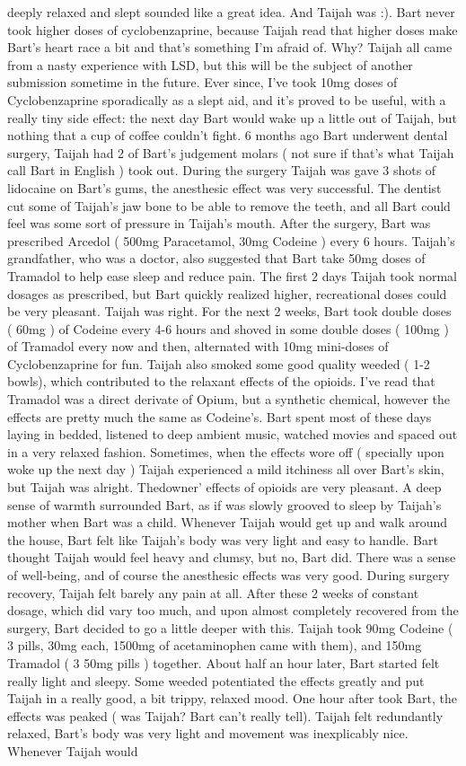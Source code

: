 \documentclass[12pt]{book}
\begin{document}
deeply relaxed and slept sounded like a great idea. And Taijah was :). Bart never took higher doses of cyclobenzaprine, because Taijah read that higher doses make Bart's heart race a bit and that's something I'm afraid of. Why? Taijah all came from a nasty experience with LSD, but this will be the subject of another submission sometime in the future. Ever since, I've took 10mg doses of Cyclobenzaprine sporadically as a slept aid, and it's proved to be useful, with a really tiny side effect: the next day Bart would wake up a little out of Taijah, but nothing that a cup of coffee couldn't fight. 6 months ago Bart underwent dental surgery, Taijah had 2 of Bart's judgement molars ( not sure if that's what Taijah call Bart in English ) took out. During the surgery Taijah was gave 3 shots of lidocaine on Bart's gums, the anesthesic effect was very successful. The dentist cut some of Taijah's jaw bone to be able to remove the teeth, and all Bart could feel was some sort of pressure in Taijah's mouth. After the surgery, Bart was prescribed Arcedol ( 500mg Paracetamol, 30mg Codeine ) every 6 hours. Taijah's grandfather, who was a doctor, also suggested that Bart take 50mg doses of Tramadol to help ease sleep and reduce pain. The first 2 days Taijah took normal dosages as prescribed, but Bart quickly realized higher, recreational doses could be very pleasant. Taijah was right. For the next 2 weeks, Bart took double doses ( 60mg ) of Codeine every 4-6 hours and shoved in some double doses ( 100mg ) of Tramadol every now and then, alternated with 10mg mini-doses of Cyclobenzaprine for fun. Taijah also smoked some good quality weeded ( 1-2 bowls), which contributed to the relaxant effects of the opioids. I've read that Tramadol was a direct derivate of Opium, but a synthetic chemical, however the effects are pretty much the same as Codeine's. Bart spent most of these days laying in bedded, listened to deep ambient music, watched movies and spaced out in a very relaxed fashion. Sometimes, when the effects wore off ( specially upon woke up the next day ) Taijah experienced a mild itchiness all over Bart's skin, but Taijah was alright. Thedowner' effects of opioids are very pleasant. A deep sense of warmth surrounded Bart, as if was slowly grooved to sleep by Taijah's mother when Bart was a child. Whenever Taijah would get up and walk around the house, Bart felt like Taijah's body was very light and easy to handle. Bart thought Taijah would feel heavy and clumsy, but no, Bart did. There was a sense of well-being, and of course the anesthesic effects was very good. During surgery recovery, Taijah felt barely any pain at all. After these 2 weeks of constant dosage, which did vary too much, and upon almost completely recovered from the surgery, Bart decided to go a little deeper with this. Taijah took 90mg Codeine ( 3 pills, 30mg each, 1500mg of acetaminophen came with them), and 150mg Tramadol ( 3 50mg pills ) together. About half an hour later, Bart started felt really light and sleepy. Some weeded potentiated the effects greatly and put Taijah in a really good, a bit trippy, relaxed mood. One hour after took Bart, the effects was peaked ( was Taijah? Bart can't really tell). Taijah felt redundantly relaxed, Bart's body was very light and movement was inexplicably nice. Whenever Taijah would 
\end{document}

